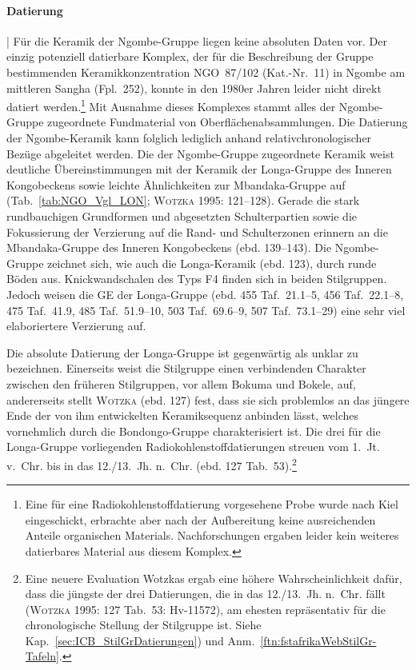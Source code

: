 \paragraph{Datierung}\hspace{-.5em}|\hspace{.5em}%
Für die Keramik der Ngombe-Gruppe liegen keine absoluten Daten vor. Der einzig potenziell datierbare Komplex, der für die Beschreibung der Gruppe bestimmenden Keramikkonzentration NGO~87/102 (Kat.-Nr.~11) in Ngombe am mittleren \mbox{Sangha} (Fpl.~252), konnte in den 1980er Jahren leider nicht direkt datiert werden.\footnote{Eine für eine Radiokohlenstoffdatierung vorgesehene Probe wurde nach Kiel eingeschickt, erbrachte aber nach der Aufbereitung keine ausreichenden Anteile organischen Materials. Nachforschungen ergaben leider kein weiteres datierbares Material aus diesem Komplex.} Mit Ausnahme dieses Komplexes stammt alles der Ngombe-Gruppe zugeordnete Fundmaterial von Oberflächenabsammlungen. Die Datierung der Ngombe-Keramik kann folglich lediglich anhand relativchronologischer Bezüge abgeleitet werden. Die der Ngombe-Gruppe zugeordnete Keramik weist deutliche Übereinstimmungen mit der Keramik der Longa-Gruppe des Inneren Kongobeckens sowie leichte Ähnlichkeiten zur Mbandaka-Gruppe auf (Tab.~\ref{tab:NGO_Vgl_LON}; \textsc{Wotzka} 1995: 121--128). Gerade die stark rundbauchigen Grundformen und abgesetzten Schulterpartien sowie die Fokussierung der Verzierung auf die Rand- und Schulterzonen erinnern an die Mbandaka-Gruppe des Inneren Kongobeckens (ebd. 139--143). Die Ngombe-Gruppe zeichnet sich, wie auch die Longa-Keramik (ebd. 123), durch runde Böden aus. Knickwandschalen des Typs F4 finden sich in beiden Stilgruppen. Jedoch weisen die GE der Longa-Gruppe (ebd. 455 Taf.~21.1--5, 456 Taf.~22.1--8, 475 Taf.~41.9, 485 Taf.~51.9--10, 503 Taf.~69.6--9, 507 Taf.~73.1--29) eine sehr viel elaboriertere Verzierung auf.

Die absolute Datierung der Longa-Gruppe ist gegenwärtig als unklar zu bezeichnen. Einerseits weist die Stilgruppe einen verbindenden Charakter zwischen den früheren Stilgruppen, vor allem Bokuma und Bokele, auf, andererseits stellt \textsc{Wotzka} (ebd. 127) fest, dass sie sich problemlos an das jüngere Ende der von ihm entwickelten Keramiksequenz anbinden lässt, welches vornehmlich durch die Bondongo-Gruppe charakterisiert ist. Die drei für die Longa-Gruppe vorliegenden Radiokohlenstoffdatierungen streuen vom 1.~Jt. v.~Chr. bis in das 12./13.~Jh. n.~Chr. (ebd. 127 Tab.~53).\footnote{Eine neuere Evaluation Wotzkas ergab eine höhere Wahrscheinlichkeit dafür, dass die jüngste der drei Datierungen, die in das 12./13.~Jh. n.~Chr. fällt (\textsc{Wotzka} 1995: 127 Tab.~53: Hv-11572), am ehesten repräsentativ für die chronologische Stellung der Stilgruppe ist. Siehe Kap.~\ref{sec:ICB_StilGrDatierungen}) und Anm.~\ref{ftn:fstafrikaWebStilGr-Tafeln}.}

